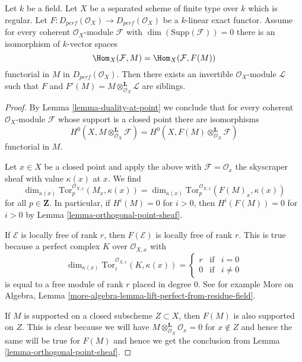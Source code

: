 \begin{lemma}
\label{lemma-preserves-Coh}
Let $k$ be a field. Let $X$ be a separated scheme of finite type over $k$ which
is regular. Let $F : D_{perf}(\mathcal{O}_X) \to D_{perf}(\mathcal{O}_X)$
be a $k$-linear exact functor. Assume for every coherent
$\mathcal{O}_X$-module $\mathcal{F}$ with $\dim(\text{Supp}(\mathcal{F})) = 0$
there is an isomorphism of $k$-vector spaces
$$
\Hom_X(\mathcal{F}, M) = \Hom_X(\mathcal{F}, F(M))
$$
functorial in $M$ in $D_{perf}(\mathcal{O}_X)$.
Then there exists an invertible $\mathcal{O}_X$-module $\mathcal{L}$
such that $F$ and $F'(M) = M \otimes_{\mathcal{O}_X}^\mathbf{L} \mathcal{L}$
are siblings.
\end{lemma}

\begin{proof}
By Lemma \ref{lemma-duality-at-point} we conclude that for every
coherent $\mathcal{O}_X$-module $\mathcal{F}$ whose support is a
closed point there are isomorphisms
$$
H^0(X, M \otimes^\mathbf{L}_{\mathcal{O}_X} \mathcal{F}) =
H^0(X, F(M) \otimes^\mathbf{L}_{\mathcal{O}_X} \mathcal{F})
$$
functorial in $M$.

\medskip\noindent
Let $x \in X$ be a closed point and apply the above with
$\mathcal{F} = \mathcal{O}_x$ the skyscraper sheaf with value
$\kappa(x)$ at $x$. We find
$$
\dim_{\kappa(x)} 
\text{Tor}^{\mathcal{O}_{X, x}}_p(M_x, \kappa(x)) =
\dim_{\kappa(x)} 
\text{Tor}^{\mathcal{O}_{X, x}}_p(F(M)_x, \kappa(x))
$$
for all $p \in \mathbf{Z}$. In particular, if
$H^i(M) = 0$ for $i > 0$, then $H^i(F(M)) = 0$ for $i > 0$
by Lemma \ref{lemma-orthogonal-point-sheaf}.

\medskip\noindent
If $\mathcal{E}$ is locally free of rank $r$, then
$F(\mathcal{E})$ is locally free of rank $r$. This is
true because a perfect complex $K$ over $\mathcal{O}_{X, x}$
with
$$
\dim_{\kappa(x)} \text{Tor}^{\mathcal{O}_{X, x}}_i(K, \kappa(x)) =
\left\{
\begin{matrix}
r & \text{if} & i = 0 \\
0 & \text{if} & i \not = 0
\end{matrix}
\right.
$$
is equal to a free module of rank $r$ placed in degree $0$. See
for example More on Algebra, Lemma
\ref{more-algebra-lemma-lift-perfect-from-residue-field}.

\medskip\noindent
If $M$ is supported on a closed subscheme $Z \subset X$, then
$F(M)$ is also supported on $Z$. This is clear because
we will have $M \otimes_{\mathcal{O}_X}^\mathbf{L} \mathcal{O}_x = 0$
for $x \not \in Z$ and hence the same will be true for $F(M)$
and hence we get the conclusion from
Lemma \ref{lemma-orthogonal-point-sheaf}.


\end{proof}

